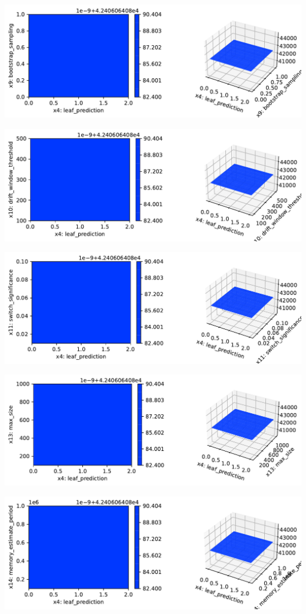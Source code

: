\documentclass[
  letterpaper,
  DIV=11,
  numbers=noendperiod]{scrreprt}
\begin{document}
\includegraphics{024_spot_hpt_river_friedman_hatr_files/figure-pdf/cell-42-output-55.pdf}

\includegraphics{024_spot_hpt_river_friedman_hatr_files/figure-pdf/cell-42-output-56.pdf}

\includegraphics{024_spot_hpt_river_friedman_hatr_files/figure-pdf/cell-42-output-57.pdf}

\includegraphics{024_spot_hpt_river_friedman_hatr_files/figure-pdf/cell-42-output-58.pdf}

\includegraphics{024_spot_hpt_river_friedman_hatr_files/figure-pdf/cell-42-output-59.pdf}
\end{document}
